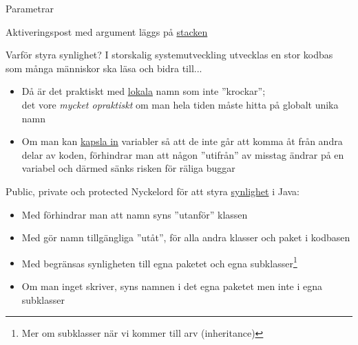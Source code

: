 \documentclass{lecturenotes}
\begin{document}
\begin{Slide}{Parametrar}

\end{Slide}

\begin{Slide}{Aktiveringspost med argument läggs på \href{https://sv.wikipedia.org/wiki/Stack_\%28mikroprocessor\%29}{stacken}}

\end{Slide}

\begin{Slide}{Varför styra synlighet?}
I storskalig systemutveckling utvecklas en stor kodbas som många människor ska läsa och bidra till...
\begin{itemize}
\item Då är det praktiskt med \href{https://en.wikipedia.org/wiki/Local_variable}{lokala} namn som inte ''krockar''; \\det vore \textit{mycket opraktiskt} om man hela tiden måste hitta på globalt unika namn
\item Om man kan \href{https://en.wikipedia.org/wiki/Encapsulation_\%28computer_programming\%29}{kapsla in} variabler så att de inte går att komma åt från andra delar av koden, förhindrar man att  någon ''utifrån'' av misstag ändrar på en variabel och därmed sänks risken för räliga buggar
\end{itemize}
\end{Slide}

\begin{Slide}{Public, private och protected}
Nyckelord för att styra \href{http://stackoverflow.com/questions/215497/in-java-whats-the-difference-between-public-default-protected-and-private}{synlighet} i Java:
\begin{itemize}
\item Med  förhindrar man att namn syns ''utanför'' klassen
\item Med  gör namn tillgängliga ''utåt'', för alla andra klasser och paket i kodbasen
\item Med  begränsas synligheten till egna paketet och egna subklasser\footnote{Mer om subklasser när vi kommer till arv (inheritance)}
\item Om man inget skriver, syns namnen i det egna paketet men inte i egna subklasser
\end{itemize}
\end{Slide}
\end{document}
